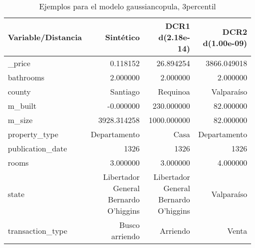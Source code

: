 \begin{table}[H]
\centering
\fontsize{10}{14}\selectfont
\caption{Ejemplos para el modelo gaussiancopula, 3percentil}
\label{table-example-economicos-b-2-gaussiancopula-3p}
\begin{tabular}{|l|r|r|r|}
\hline
\rowcolor[gray]{0.8}
Variable/Distancia & Sintético & DCR1 d(2.18e-14) & DCR2 d(1.00e-09) \\
\hline \_price & \cellcolor[rgb]{0.9, 0.54, 0.52} 0.118152 & 26.894254 & 3866.049018 \\
\hline bathrooms & \cellcolor[rgb]{0.9, 0.54, 0.52} 2.000000 & \cellcolor[rgb]{0.9, 0.54, 0.52} 2.000000 & \cellcolor[rgb]{0.9, 0.54, 0.52} 2.000000 \\
\hline county & \cellcolor[rgb]{0.9, 0.54, 0.52} Santiago & Requinoa & Valparaíso \\
\hline m\_built & \cellcolor[rgb]{0.9, 0.54, 0.52} -0.000000 & 230.000000 & 82.000000 \\
\hline m\_size & \cellcolor[rgb]{0.9, 0.54, 0.52} 3928.314258 & 1000.000000 & 82.000000 \\
\hline property\_type & \cellcolor[rgb]{0.9, 0.54, 0.52} Departamento & Casa & \cellcolor[rgb]{0.9, 0.54, 0.52} Departamento \\
\hline publication\_date & \cellcolor[rgb]{0.9, 0.54, 0.52} 1326 & \cellcolor[rgb]{0.9, 0.54, 0.52} 1326 & \cellcolor[rgb]{0.9, 0.54, 0.52} 1326 \\
\hline rooms & \cellcolor[rgb]{0.9, 0.54, 0.52} 3.000000 & \cellcolor[rgb]{0.9, 0.54, 0.52} 3.000000 & 4.000000 \\
\hline state & \cellcolor[rgb]{0.9, 0.54, 0.52} Libertador General Bernardo O'higgins & \cellcolor[rgb]{0.9, 0.54, 0.52} Libertador General Bernardo O'higgins & Valparaíso \\
\hline transaction\_type & \cellcolor[rgb]{0.9, 0.54, 0.52} Busco arriendo & Arriendo & Venta \\
\hline
\end{tabular}
\end{table}
